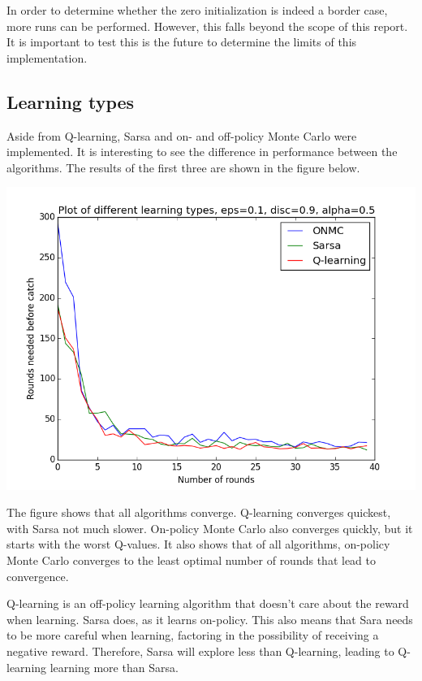 \documentclass{article}
\begin{document}
In order to determine whether the zero initialization is indeed a border case, more runs can be performed. However, this falls beyond the scope of this report. It is important to test this is the future to determine the limits of this implementation.

\subsection{Learning types}
Aside from Q-learning, Sarsa and on- and off-policy Monte Carlo were implemented. It is interesting to see the difference in performance between the algorithms. The results of the first three are shown in the figure below.

\begin{center}
	\includegraphics[scale=0.4]{learning_types}
	\label{fig:learningalgs}
\end{center}

The figure shows that all algorithms converge. Q-learning converges quickest, with Sarsa not much slower. On-policy Monte Carlo also converges quickly, but it starts with the worst Q-values. It also shows that of all algorithms, on-policy Monte Carlo converges to the least optimal number of rounds that lead to convergence.

Q-learning is an off-policy learning algorithm that doesn't care about the reward when learning. Sarsa does, as it learns on-policy. This also means that Sara needs to be more careful when learning, factoring in the possibility of receiving a negative reward. Therefore, Sarsa will explore less than Q-learning, leading to Q-learning learning more than Sarsa.
\end{document}
